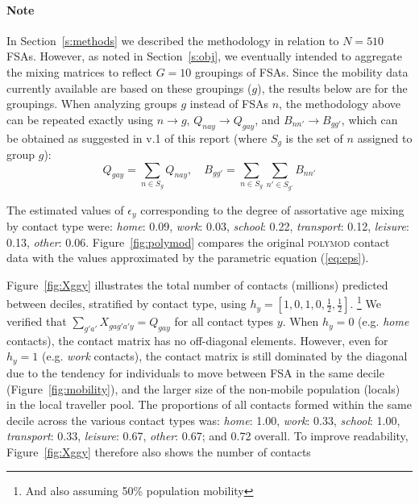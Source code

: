 \documentclass{article}
\begin{document}
  \paragraph{Note}
  In Section~\ref{s:methods} we described the methodology in relation to $N=510$ FSAs.
  However, as noted in Section~\ref{s:obj}, we eventually intended to aggregate the mixing matrices
  to reflect $G=10$ groupings of FSAs.
  Since the mobility data currently available are based on these groupings ($g$),
  the results below are for the groupings.
  When analyzing groups $g$ instead of FSAs $n$,
  the methodology above can be repeated exactly using $n \rightarrow g$,
  $Q_{nay} \rightarrow Q_{gay}$, and $B_{nn'} \rightarrow B_{gg'}$,
  which can be obtained as suggested in v.1 of this report
  (where $S_g$ is the set of $n$ assigned to group $g$):
  \begin{equation}
    Q_{gay} = \sum_{n \in S_g} Q_{nay},\quad
    B_{gg'} = \sum_{n \in S_g} \sum_{n' \in S_{g'}} B_{nn'}
  \end{equation}
  \par
  The estimated values of $\epsilon_y$ corresponding to
  the degree of assortative age mixing by contact type were:
  \emph{home}: 0.09, \emph{work}: 0.03, \emph{school}: 0.22, \emph{transport}: 0.12, \emph{leisure}: 0.13, \emph{other}: 0.06.
  Figure~\ref{fig:polymod} compares the original \textsc{polymod} contact data with
  the values approximated by the parametric equation (\ref{eq:eps}).
  \par
  Figure~\ref{fig:Xggy} illustrates the total number of contacts (millions)
  predicted between deciles, stratified by contact type,
  using $h_y = [1,0,1,0,\frac{1}{2},\frac{1}{2}]$.%
  \footnote{And also assuming 50\% population mobility}
  We verified that $\sum_{g'a'} {X_{gag'a'y}} = Q_{gay}$ for all contact types $y$.
  When $h_y = 0$ (e.g. \emph{home} contacts), the contact matrix has no off-diagonal elements.
  However, even for $h_y = 1$ (e.g. \emph{work} contacts),
  the contact matrix is still dominated by the diagonal
  due to the tendency for individuals to move between FSA in the same decile
  (Figure~\ref{fig:mobility}),
  and the larger size of the non-mobile population (locals) in the local traveller pool.
  The proportions of all contacts formed within the same decile across the various contact types was:
  \emph{home}: 1.00, \emph{work}: 0.33, \emph{school}: 1.00, \emph{transport}: 0.33, \emph{leisure}: 0.67, \emph{other}: 0.67;
  and 0.72 overall.
  To improve readability, Figure~\ref{fig:Xggy} therefore also shows the number of contacts
\end{document}
